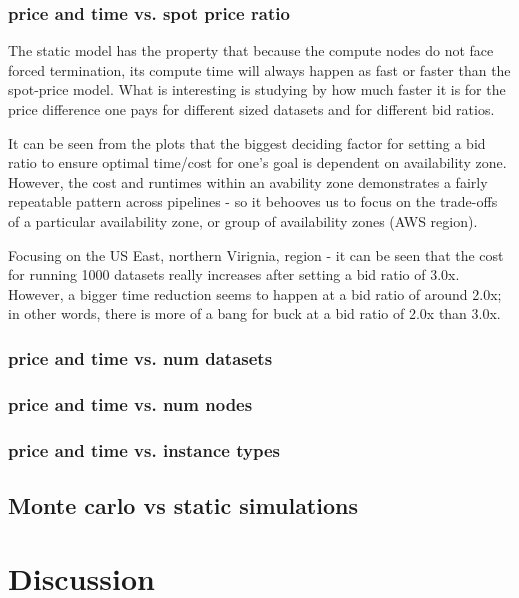 \documentclass{frontiersSCNS} %
\begin{document}
\subsubsection{price and time vs. spot price ratio}

The static model has the property that because the compute nodes do not face forced termination, its compute time will always happen as fast or faster than the spot-price model. What is interesting is studying by how much faster it is for the price difference one pays for different sized datasets and for different bid ratios.

It can be seen from the plots that the biggest deciding factor for setting a bid ratio to ensure optimal time/cost for one's goal is dependent on availability zone. However, the cost and runtimes within an avability zone demonstrates a fairly repeatable pattern across pipelines - so it behooves us to focus on the trade-offs of a particular availability zone, or group of availability zones (AWS region). 

Focusing on the US East, northern Virignia, region - it can be seen that the cost for running 1000 datasets really increases after setting a bid ratio of 3.0x. However, a bigger time reduction seems to happen at a bid ratio of around 2.0x; in other words, there is more of a bang for buck at a bid ratio of 2.0x than 3.0x.

\subsubsection{price and time vs. num datasets}
\subsubsection{price and time vs. num nodes}
\subsubsection{price and time vs. instance types}

\subsection{Monte carlo vs static simulations}



\section{Discussion}
\end{document}
